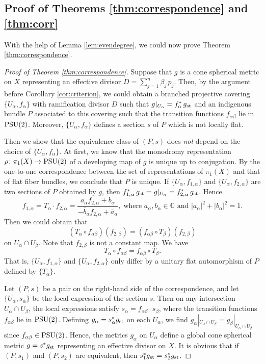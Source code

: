 \documentclass[12pt]{article}
\begin{document}
\subsection{Proof of Theorems \ref{thm:correspondence} and \ref{thm:corr}}
\label{subsec:pf}
With the help of Lemma \ref{lem:evendegree}, we could now prove Theorem \ref{thm:correspondence}.
\begin{proof}[Proof of Theorem \ref{thm:correspondence}]

Suppose that $g$ is a cone spherical metric on $X$ representing an effective divisor $D = \sum_{j=1}^n \beta_j \, p_j$. Then, by the argument before Corollary \ref{cor:criterion}, we could obtain a branched projective covering $\{U_{\alpha}, f_{\alpha}\}$ with ramification divisor $D$ such that $g|_{U_\alpha}=f^*_\alpha\, g_{\rm st}$ and an indigenous bundle $P$ associated to this covering such that the transition functions $f_{\alpha\beta}$ lie in ${\rm PSU(2)}$. Moreover, $\{U_{\alpha}, f_{\alpha}\}$ defines a section $s$ of $P$ which is not locally flat.

Then we show that the equivalence class of $(P, s)$ does \emph{not} depend on the choice of $\{U_{\alpha}, f_{\alpha}\}$. At first, we know that the monodromy representation $\rho \colon \pi_{1}(X) \to {\rm PSU}(2)$ of a developing map of $g$ is unique up to conjugation. By the one-to-one correspondence between the set of representations of $\pi_{1}(X)$ and that of flat fiber bundles, we conclude that $P$ is unique. If $\{U_{\alpha}, f_{1, \alpha}\}$ and $\{U_{\alpha}, f_{2, \alpha}\}$ are two sections of $P$ obtained by $g$, then $f_{1,\alpha}^*\, g_{\rm st} = g|_{U_\alpha}= f_{2,\alpha}^*\, g_{\rm st}$. Hence \cite[Section 2]{CWWX2015}
\[ f_{1, \alpha} = T_{\alpha} \cdot f_{2, \alpha} = \frac{a_{\alpha}f_{2, \alpha} + b_{\alpha} }{-\bar{b}_{\alpha} f_{2, \alpha} + \bar{a}_{\alpha}}, \; \text{where }a_{\alpha}, b_{\alpha} \in \mathbb{C}\text{ and }|a_{\alpha}|^{2} + |b_{\alpha}|^{2} = 1. \]
Then we could obtain that
\[ (T_{\alpha} \circ f_{\alpha \beta})(f_{2, \beta}) = (f_{\alpha \beta} \circ T_{\beta})(f_{2, \beta}) \]
on $U_{\alpha} \cap U_{\beta}$. Note that $f_{2, \beta}$ is not a constant map. We have
\[ T_{\alpha} \circ f_{\alpha \beta} = f_{\alpha \beta} \circ T_{\beta}. \]
That is, $\{U_{\alpha}, f_{1, \alpha}\}$ and $\{U_{\alpha}, f_{2, \alpha}\}$  only differ by a unitary flat automorphism of $P$ defined by $\{T_{\alpha}\}$.

Let $(P, s)$ be a pair on the right-hand side of the correspondence, and let $\{U_{\alpha}, s_{\alpha}\}$ be the local expression of the section $s$. Then on any intersection $U_{\alpha} \cap U_{\beta}$, the local expressions satisfy $ s_{\alpha} = f_{\alpha\beta} \cdot s_{\beta}$, where the transition functions $f_{\alpha\beta}$ lie in ${\rm PSU}(2)$. Defining $g_{\alpha} = s_{\alpha}^*g_{\rm st}$ on each $U_{\alpha}$, we find $g_{\alpha}|_{U_{\alpha}\cap U_{\beta}} = g_{\beta}|_{U_{\alpha}\cap U_{\beta}}$ since $f_{\alpha\beta} \in {\rm PSU(2)}$. Hence, the metrics $g_{\alpha}$ on $U_\alpha$ define a global cone spherical metric $g = s^*g_{\rm st}$ representing an effective divisor on $X$. It is obvious that if $(P, s_{1})$ and $(P, s_{2})$ are equivalent, then $s_{1}^*g_{\rm st}= s_{2}^*g_{\rm st}$.


\end{proof}
\end{document}
